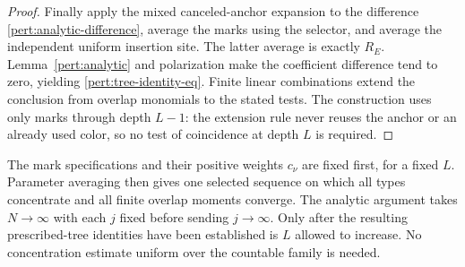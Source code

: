 \begin{proof}
Finally apply the mixed canceled-anchor expansion to the difference
\eqref{pert:analytic-difference}, average the marks using the
selector, and average the independent uniform insertion site.  The
latter average is exactly $R_E$.  Lemma~\ref{pert:analytic} and
polarization make the coefficient difference tend to zero, yielding
\eqref{pert:tree-identity-eq}.  Finite linear combinations extend the
conclusion from overlap monomials to the stated tests.  The
construction uses only marks through depth $L-1$: the extension rule
never reuses the anchor or an already used color, so no test of
coincidence at depth $L$ is required.
\end{proof}

\begin{remark}
The mark specifications and their positive weights $c_\nu$ are fixed
first, for a fixed $L$.  Parameter averaging then gives one selected
sequence on which all types concentrate and all finite overlap
moments converge.  The analytic argument takes $N\to\infty$ with
each $j$ fixed before sending $j\to\infty$.  Only after the resulting
prescribed-tree identities have been established is $L$ allowed to
increase.  No concentration estimate uniform over the countable
family is needed.
\end{remark}
